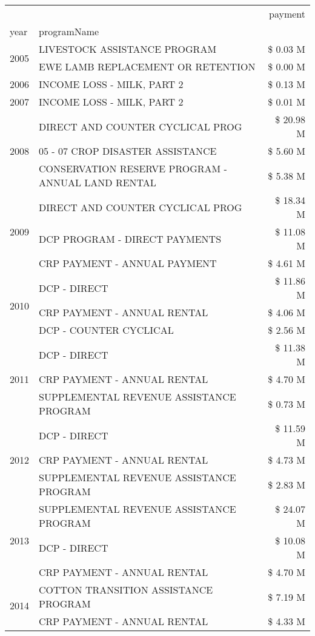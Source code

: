 \begin{tabular}{llr}
\toprule
 &  & payment \\
year & programName &  \\
\midrule
\multirow[t]{2}{*}{2005} & LIVESTOCK ASSISTANCE PROGRAM & \$ 0.03 M \\
 & EWE LAMB REPLACEMENT OR RETENTION & \$ 0.00 M \\
\cline{1-3}
2006 & INCOME LOSS - MILK, PART 2 & \$ 0.13 M \\
\cline{1-3}
2007 & INCOME LOSS - MILK, PART 2 & \$ 0.01 M \\
\cline{1-3}
\multirow[t]{3}{*}{2008} & DIRECT AND COUNTER CYCLICAL PROG & \$ 20.98 M \\
 & 05 - 07 CROP DISASTER ASSISTANCE & \$ 5.60 M \\
 & CONSERVATION RESERVE PROGRAM - ANNUAL LAND RENTAL & \$ 5.38 M \\
\cline{1-3}
\multirow[t]{3}{*}{2009} & DIRECT AND COUNTER CYCLICAL PROG & \$ 18.34 M \\
 & DCP PROGRAM - DIRECT PAYMENTS & \$ 11.08 M \\
 & CRP PAYMENT - ANNUAL PAYMENT & \$ 4.61 M \\
\cline{1-3}
\multirow[t]{3}{*}{2010} & DCP - DIRECT & \$ 11.86 M \\
 & CRP PAYMENT - ANNUAL RENTAL & \$ 4.06 M \\
 & DCP - COUNTER CYCLICAL & \$ 2.56 M \\
\cline{1-3}
\multirow[t]{3}{*}{2011} & DCP - DIRECT & \$ 11.38 M \\
 & CRP PAYMENT - ANNUAL RENTAL & \$ 4.70 M \\
 & SUPPLEMENTAL REVENUE ASSISTANCE PROGRAM & \$ 0.73 M \\
\cline{1-3}
\multirow[t]{3}{*}{2012} & DCP - DIRECT & \$ 11.59 M \\
 & CRP PAYMENT - ANNUAL RENTAL & \$ 4.73 M \\
 & SUPPLEMENTAL REVENUE ASSISTANCE PROGRAM & \$ 2.83 M \\
\cline{1-3}
\multirow[t]{3}{*}{2013} & SUPPLEMENTAL REVENUE ASSISTANCE PROGRAM & \$ 24.07 M \\
 & DCP - DIRECT & \$ 10.08 M \\
 & CRP PAYMENT - ANNUAL RENTAL & \$ 4.70 M \\
\cline{1-3}
\multirow[t]{3}{*}{2014} & COTTON TRANSITION ASSISTANCE PROGRAM & \$ 7.19 M \\
 & CRP PAYMENT - ANNUAL RENTAL & \$ 4.33 M \\

\end{tabular}
